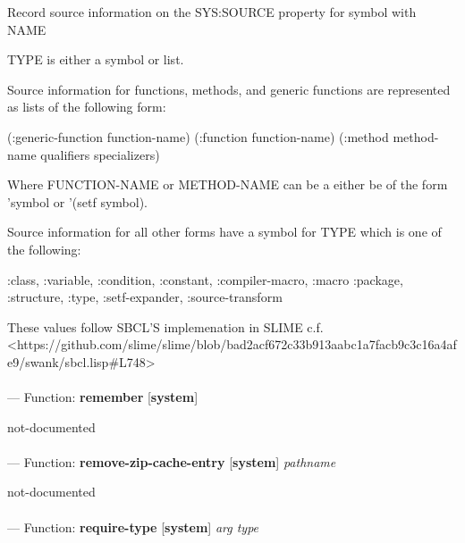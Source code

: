 \begin{adjustwidth}{5em}{5em}
Record source information on the SYS:SOURCE property for symbol with NAME

TYPE is either a symbol or list.

Source information for functions, methods, and generic functions are
represented as lists of the following form:

    (:generic-function function-name)
    (:function function-name)
    (:method method-name qualifiers specializers)

Where FUNCTION-NAME or METHOD-NAME can be a either be of the form
'symbol or '(setf symbol).

Source information for all other forms have a symbol for TYPE which is
one of the following:

:class, :variable, :condition, :constant, :compiler-macro, :macro
:package, :structure, :type, :setf-expander, :source-transform

These values follow SBCL'S implemenation in SLIME
c.f. <https://github.com/slime/slime/blob/bad2acf672c33b913aabc1a7facb9c3c16a4afe9/swank/sbcl.lisp\#L748>


\end{adjustwidth}

\paragraph{}
\label{SYSTEM:REMEMBER}
--- Function: \textbf{remember} [\textbf{system}] \textit{}

\begin{adjustwidth}{5em}{5em}
not-documented
\end{adjustwidth}

\paragraph{}
\label{SYSTEM:REMOVE-ZIP-CACHE-ENTRY}
--- Function: \textbf{remove-zip-cache-entry} [\textbf{system}] \textit{pathname}

\begin{adjustwidth}{5em}{5em}
not-documented
\end{adjustwidth}

\paragraph{}
\label{SYSTEM:REQUIRE-TYPE}
--- Function: \textbf{require-type} [\textbf{system}] \textit{arg type}

